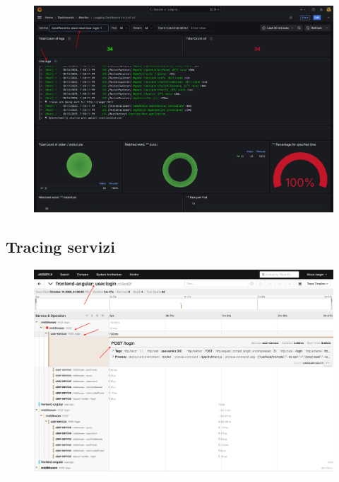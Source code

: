  \begin{figure}[h!]
    \centering 
    \includegraphics[scale=0.45]{report/img/logging-service.png}
    \caption{}
    \label{log_tracing}
\end{figure}

\subsection{Tracing servizi}

 \begin{figure}[h!]
    \centering 
    \includegraphics[scale=0.45]{report/img/Jaeger-UI.png}
    \caption{}
    \label{service_tracing}
\end{figure}